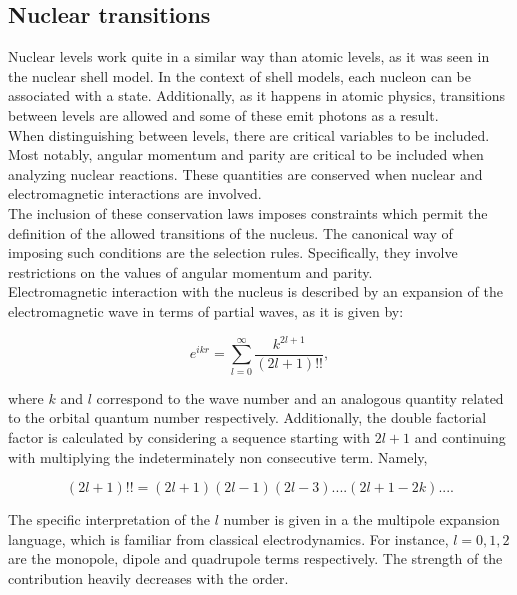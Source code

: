 \documentclass[openany]{book}
\begin{document}
\subsection{Nuclear transitions}  \label{sub:nuclearTransitions}

Nuclear levels work quite in a similar way than atomic levels, as it was seen in the nuclear shell model. In the context of shell models, each nucleon can be associated with a state.  Additionally, as it happens in atomic physics, transitions between levels are allowed and some of these emit photons as a result. \\

When distinguishing between levels, there are critical variables to be included. Most notably, angular momentum and parity are critical to be included when analyzing nuclear reactions. These quantities are conserved when nuclear and electromagnetic interactions are involved.  \\

The inclusion of these conservation laws imposes constraints which permit the definition of the allowed transitions of the nucleus. The canonical way of imposing such conditions are the selection rules. Specifically, they involve restrictions on the values of angular momentum and parity.  \\

Electromagnetic interaction with the nucleus is described by an expansion of the electromagnetic wave in terms of partial waves, as it is given by: 

\begin{equation}\label{eq:nuclearTransitions_waveExpansion}
	e^{ikr} = \sum_{l = 0}^{\infty} {\frac{k^{2l + 1}}{(2l +1)!!}}, 
\end{equation}

where $k$ and $l$ correspond to the wave number and an analogous quantity related to the orbital quantum number respectively. Additionally, the double factorial factor is calculated by considering a sequence starting with $2l +1$ and continuing with multiplying the indeterminately non consecutive term. Namely, 

\begin{equation}\label{eq:nuclearTransitions_doubleFactorial}
	(2l + 1)!! = (2l +1)(2l-1)(2l -3 ) .... (2l + 1 - 2k) ....
\end{equation}

The specific interpretation of the $l$ number is given in a the multipole expansion language, which is familiar from classical electrodynamics.  For instance, $l = 0, 1, 2$ are the monopole, dipole and quadrupole terms respectively. The strength of the contribution heavily decreases with the order.  \\
\end{document}
